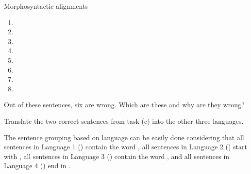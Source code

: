 \begin{refsection}
\begin{problem}{Morphosyntactic alignments}{\nameVNeacsu}{}
\begin{assgts}
\begin{enumerate}[start = 17]
    \item {}
    \item {}
    \item {}
    \item {}
    \item {}
    \item {}
    \item {}
    \item {}
\end{enumerate}
\item[] Out of these sentences, six are wrong. Which are these and why are they wrong?
\item Translate the two correct sentences from task (c) into the other three languages.
\end{assgts}
\end{problem}

\begin{mysolution}

\begin{description}[labelwidth=\widthof{\bfseries Step 3.},leftmargin=!]
\item[Step 1.] The sentence grouping based on language can be easily done considering that all sentences in Language 1 (\langnameDyirbal) contain the word , all sentences in Language 2 (\langnameTahitian) start with , all sentences in Language 3 (\langnameNezPerce) contain the word , and all sentences in Language 4 (\langnameWappo) end in .


\end{description}
\end{mysolution}
\end{refsection}
